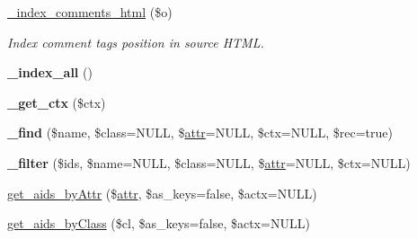 \begin{DoxyCompactItemize}
\item 
\mbox{\label{classduzun_1_1hQuery_1_1HTML__Parser_af71688120ebc569f1f927fd49a8d8a6d}} 
\mbox{\hyperlink{classduzun_1_1hQuery_1_1HTML__Parser_af71688120ebc569f1f927fd49a8d8a6d}{\+\_\+index\+\_\+comments\+\_\+html}} (\$o)
\begin{DoxyCompactList}\small\item\em Index comment tags position in source H\+T\+ML. \end{DoxyCompactList}\item 
\mbox{\label{classduzun_1_1hQuery_1_1HTML__Parser_a998f520ac070759080bab2319a2e8066}} 
{\bfseries \+\_\+index\+\_\+all} ()
\item 
\mbox{\label{classduzun_1_1hQuery_1_1HTML__Parser_aa20858a8076d9319423f2cdd6a8efb8c}} 
{\bfseries \+\_\+get\+\_\+ctx} (\$ctx)
\item 
\mbox{\label{classduzun_1_1hQuery_1_1HTML__Parser_ab03fc1cb5c169a2ee49354db13bed1a5}} 
{\bfseries \+\_\+find} (\$name, \$class=N\+U\+LL, \$\mbox{\hyperlink{classduzun_1_1hQuery_1_1Node_a530ab9e8edeb1e876b369dcb321208c0}{attr}}=N\+U\+LL, \$ctx=N\+U\+LL, \$rec=true)
\item 
\mbox{\label{classduzun_1_1hQuery_1_1HTML__Parser_aaa094e6668fb9274baf23fe10639a568}} 
{\bfseries \+\_\+filter} (\$ids, \$name=N\+U\+LL, \$class=N\+U\+LL, \$\mbox{\hyperlink{classduzun_1_1hQuery_1_1Node_a530ab9e8edeb1e876b369dcb321208c0}{attr}}=N\+U\+LL, \$ctx=N\+U\+LL)
\item 
\mbox{\hyperlink{classduzun_1_1hQuery_1_1HTML__Parser_aa41f6709d61ef133065bf7fce7cc7ca7}{get\+\_\+aids\+\_\+by\+Attr}} (\$\mbox{\hyperlink{classduzun_1_1hQuery_1_1Node_a530ab9e8edeb1e876b369dcb321208c0}{attr}}, \$as\+\_\+keys=false, \$actx=N\+U\+LL)
\item 
\mbox{\hyperlink{classduzun_1_1hQuery_1_1HTML__Parser_aa15518a385a1acf4e2d174e2c2a1bbeb}{get\+\_\+aids\+\_\+by\+Class}} (\$cl, \$as\+\_\+keys=false, \$actx=N\+U\+LL)
\item 
\mbox{\label{classduzun_1_1hQuery_1_1HTML__Parser_a15c2877b3fb48638f6b72ee63fba48b3}} 

\end{DoxyCompactItemize}
